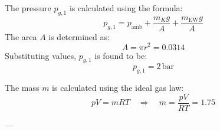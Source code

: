 The pressure \( p_{g,1} \) is calculated using the formula:  
\[
p_{g,1} = p_{\text{amb}} + \frac{m_K g}{A} + \frac{m_{\text{EW}} g}{A}
\]  
The area \( A \) is determined as:  
\[
A = \pi r^2 = 0.0314
\]  
Substituting values, \( p_{g,1} \) is found to be:  
\[
p_{g,1} = 2 \, \text{bar}
\]  

The mass \( m \) is calculated using the ideal gas law:  
\[
p V = m R T \quad \Rightarrow \quad m = \frac{p V}{R T} = 1.75
\]  

---